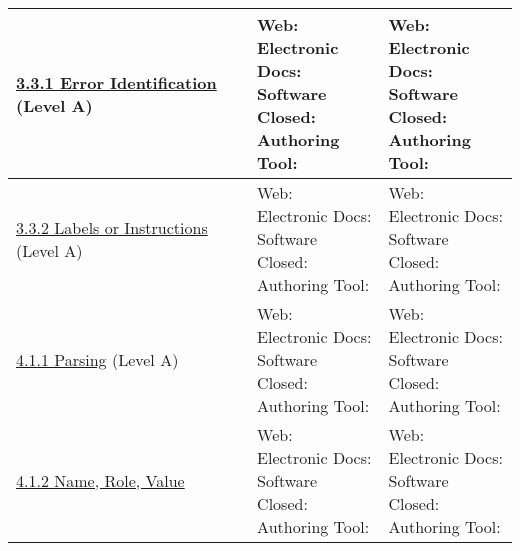 \documentclass[a4paper]{report}
\begin{document}
\begin{longtable}{|l|l|l|}
        \hline
        \href{http://www.w3.org/TR/WCAG20/#minimize-error-identified}{3.3.1 Error Identification} (Level A) & \makecell{Web: \\ Electronic Docs: \\ Software \\ Closed: \\ Authoring Tool:} & \makecell{Web: \\ Electronic Docs: \\ Software \\ Closed: \\ Authoring Tool:}\\
        \hline
        \href{http://www.w3.org/TR/WCAG20/#minimize-error-cues}{3.3.2 Labels or Instructions} (Level A) & \makecell{Web: \\ Electronic Docs: \\ Software \\ Closed: \\ Authoring Tool:} & \makecell{Web: \\ Electronic Docs: \\ Software \\ Closed: \\ Authoring Tool:}\\
        \hline
        \href{http://www.w3.org/TR/WCAG20/#ensure-compat-parses}{4.1.1 Parsing} (Level A) & \makecell{Web: \\ Electronic Docs: \\ Software \\ Closed: \\ Authoring Tool:} & \makecell{Web: \\ Electronic Docs: \\ Software \\ Closed: \\ Authoring Tool:}\\
        \hline
        \href{http://www.w3.org/TR/WCAG20/#ensure-compat-rsv}{4.1.2 Name, Role, Value} & \makecell{Web: \\ Electronic Docs: \\ Software \\ Closed: \\ Authoring Tool:} & \makecell{Web: \\ Electronic Docs: \\ Software \\ Closed: \\ Authoring Tool:}\\
        \hline
 	\end{longtable}
\end{document}
